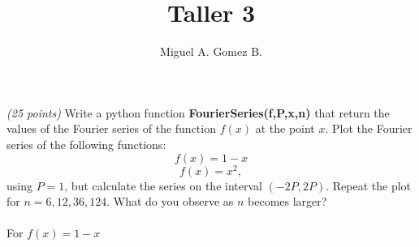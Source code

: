\documentclass{article}
\title{Taller 3}
\author{Miguel A. Gomez B.}
\begin{document}
	\maketitle
\paragraph{}\textit{(25 points)} Write a python function \textbf{FourierSeries(f,P,x,n)} that return the values of the Fourier series of the function $f(x)$ at the point $x$. Plot the Fourier series of the following functions:
$$f(x) = 1-x$$
$$f(x) = x^2,$$
using $P=1$, but calculate the series on the interval $(-2P, 2P)$. Repeat the plot for $n = 6, 12, 36, 124$. What do you observe as $n$ becomes larger?

\paragraph{} For $f(x) = 1-x$
\end{document}
